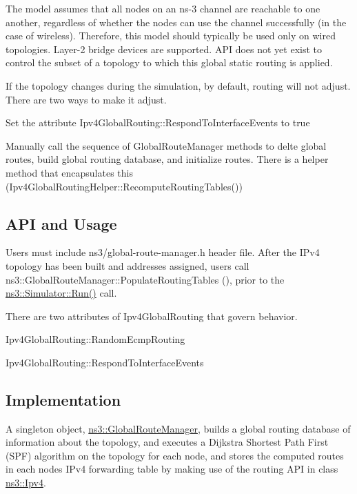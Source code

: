 The model assumes that all nodes on an ns-\/3 channel are reachable to one another, regardless of whether the nodes can use the channel successfully (in the case of wireless). Therefore, this model should typically be used only on wired topologies. Layer-\/2 bridge devices are supported. A\+PI does not yet exist to control the subset of a topology to which this global static routing is applied.

If the topology changes during the simulation, by default, routing will not adjust. There are two ways to make it adjust.
\begin{DoxyItemize}
\item Set the attribute Ipv4\+Global\+Routing\+::\+Respond\+To\+Interface\+Events to true
\item Manually call the sequence of Global\+Route\+Manager methods to delte global routes, build global routing database, and initialize routes. There is a helper method that encapsulates this (Ipv4\+Global\+Routing\+Helper\+::\+Recompute\+Routing\+Tables())
\end{DoxyItemize}\hypertarget{group__globalrouting_api}{}\subsection{A\+P\+I and Usage}\label{group__globalrouting_api}
Users must include ns3/global-\/route-\/manager.\+h header file. After the I\+Pv4 topology has been built and addresses assigned, users call ns3\+::\+Global\+Route\+Manager\+::\+Populate\+Routing\+Tables (), prior to the \hyperlink{classns3_1_1Simulator_a84be982e6d03b62c3dc3303c75a9b909}{ns3\+::\+Simulator\+::\+Run()} call.

There are two attributes of Ipv4\+Global\+Routing that govern behavior.
\begin{DoxyItemize}
\item Ipv4\+Global\+Routing\+::\+Random\+Ecmp\+Routing
\item Ipv4\+Global\+Routing\+::\+Respond\+To\+Interface\+Events
\end{DoxyItemize}\hypertarget{group__nix-vector-routing_impl}{}\subsection{Implementation}\label{group__nix-vector-routing_impl}
A singleton object, \hyperlink{classns3_1_1GlobalRouteManager}{ns3\+::\+Global\+Route\+Manager}, builds a global routing database of information about the topology, and executes a Dijkstra Shortest Path First (S\+PF) algorithm on the topology for each node, and stores the computed routes in each node\textquotesingle{}s I\+Pv4 forwarding table by making use of the routing A\+PI in class \hyperlink{classns3_1_1Ipv4}{ns3\+::\+Ipv4}.

